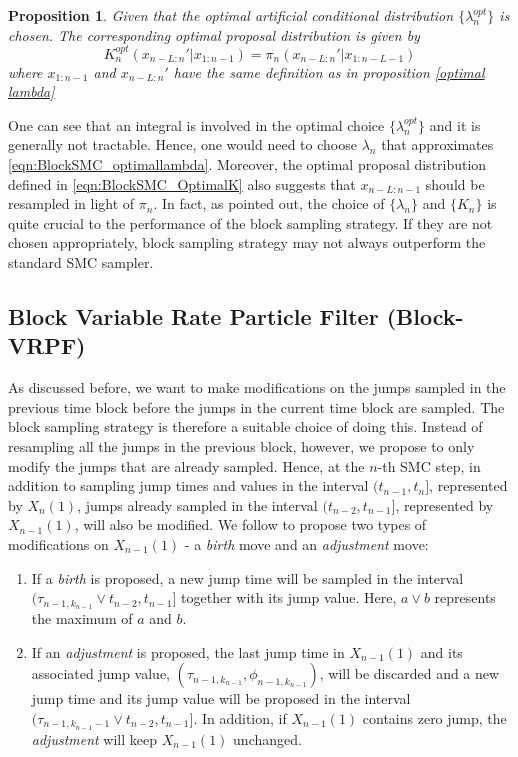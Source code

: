 \documentclass[12pt,a4paper]{article}
\newtheorem{proposition}{Proposition}
\begin{document}
\begin{proposition}\label{Optimal proposal kernel}
    Given that the optimal artificial conditional distribution \(\{\lambda_n^{opt}\}\) is chosen. The corresponding optimal proposal distribution is given by 
    \begin{equation}
        \label{eqn:BlockSMC_OptimalK} 
        K_n^{opt}(x_{n-L:n}'|x_{1:n-1}) = \pi_n(x_{n-L:n}'|x_{1:n-L-1})
    \end{equation}
    where \(x_{1:n-1}\) and \(x_{n-L:n}'\) have the same definition as in \textit{proposition} \ref{optimal lambda}
\end{proposition}
One can see that an integral is involved in the optimal choice \(\{\lambda_n^{opt}\}\) and it is generally not tractable. Hence, one would need to choose \(\lambda_n\) that approximates \eqref{eqn:BlockSMC_optimallambda}. Moreover, the optimal proposal distribution defined in \eqref{eqn:BlockSMC_OptimalK} also suggests that \(x_{n-L:n-1}\) should be resampled in light of \(\pi_n\). In fact, as \cite{doucet2006efficient} pointed out, the choice of \(\{\lambda_n\}\) and \(\{K_n\}\) is quite crucial to the performance of the block sampling strategy. If they are not chosen appropriately, block sampling strategy may not always outperform the standard SMC sampler. 
\subsection{Block Variable Rate Particle Filter (Block-VRPF)}
As discussed before, we want to make modifications on the jumps sampled in the previous time block before the jumps in the current time block are sampled. The block sampling strategy is therefore a suitable choice of doing this. Instead of resampling all the jumps in the previous block, however, we propose to only modify the jumps that are already sampled. Hence, at the $n$-th SMC step, in addition to sampling jump times and values in the interval $(t_{n-1},t_n]$, represented by $X_n(1)$, jumps already sampled in the interval $(t_{n-2},t_{n-1}]$, represented by $X_{n-1}(1)$, will also be modified. We follow \cite{whiteley2011monte} to propose two types of modifications on $X_{n-1}(1)$ - a \textit{birth} move and an \textit{adjustment} move:
\begin{enumerate}
    \item If a \textit{birth} is proposed, a new jump time will be sampled in the interval $(\tau_{n-1,k_{n-1}}\vee t_{n-2},t_{n-1}]$ together with its jump value. Here, $a \vee b$ represents the maximum of $a$ and $b$. 
    \item If an \textit{adjustment} is proposed, the last jump time in $X_{n-1}(1)$ and its associated jump value, $\left(\tau_{n-1,k_{n-1}},\phi_{n-1,k_{n-1}}\right)$, will be discarded and a new jump time and its jump value will be proposed in the interval $(\tau_{n-1,k_{n-1}-1} \vee t_{n-2},t_{n-1}]$. In addition, if $X_{n-1}(1)$ contains zero jump, the \textit{adjustment} will keep $X_{n-1}(1)$ unchanged. 
\end{enumerate}
\end{document}
